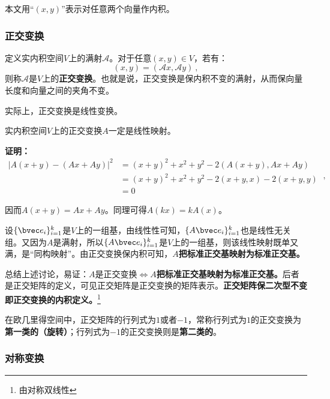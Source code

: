 
本文用“$(x,y)$”表示对任意两个向量作内积。
\subsubsection{正交变换}
\begin{definition}{}
定义实内积空间$V$上的满射$\mathcal A$。对于任意$(x,y)\in V$，若有：
\begin{equation}
(x,y)=(\mathcal A x,\mathcal A y)~,
\end{equation}
则称$\mathcal A$是$V$上的\textbf{正交变换}。也就是说，正交变换是保内积不变的满射，从而保向量长度和向量之间的夹角不变。
\end{definition}
实际上，正交变换是线性变换。
\begin{theorem}{}
实内积空间$V$上的正交变换$A$一定是线性映射。
\end{theorem}
\textbf{证明：}
\begin{equation}
\begin{aligned}
|A(x+y)-(Ax+Ay)|^2&=(x+y)^2+x^2+y^2-2\left(A(x+y),Ax+Ay\right)\\
&=(x+y)^2+x^2+y^2-2(x+y,x)-2(x+y,y)\\
&=0
\end{aligned}
~,\end{equation}

因而$A(x+y)=Ax+Ay$。同理可得$A(kx)=kA(x)$。

设$\{\bvec e_i\}^k_{i=1}$是$V$上的一组基，由线性性可知，$\{A\bvec e_i\}^k_{i=1}$也是线性无关组。又因为$A$是满射，所以$\{A\bvec e_i\}^k_{i=1}$是$V$上的一组基，则该线性映射既单又满，是“同构映射”。由正交变换保内积可知，$A$\textbf{把标准正交基映射为标准正交基。}

总结上述讨论，易证：$A$是正交变换$\Longleftrightarrow A$\textbf{把标准正交基映射为标准正交基。}后者是正交矩阵的定义，可见正交矩阵是正交变换的矩阵表示。\textbf{正交矩阵保二次型不变即正交变换的内积定义。}\footnote{由对称双线性}

在欧几里得空间中，正交矩阵的行列式为$1$或者$-1$，常称行列式为$1$的正交变换为\textbf{第一类的（旋转）}；行列式为$-1$的正交变换则是\textbf{第二类的}。
\subsubsection{对称变换}



